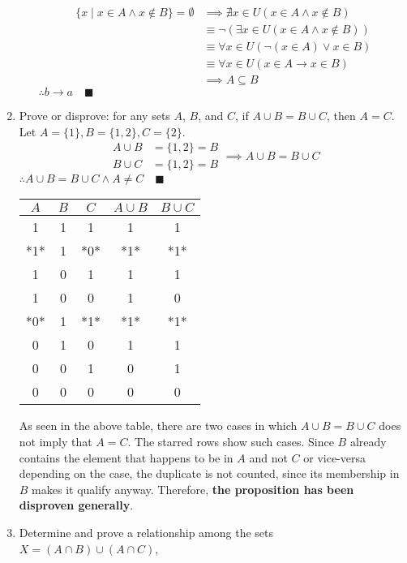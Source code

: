 \documentclass[letterpaper, 12pt]{article}
\newcommand{\qed}{\quad \blacksquare}
\newcommand{\then}{\rightarrow}
\newcommand{\0}{\emptyset}
\begin{document}
\begin{enumerate}
\begin{enumerate}[i.]
    \begin{align*}
        \{x \mid x \in A \wedge x \notin B\} = \0 
        &\implies \nexists x \in U(x \in A \wedge x \notin B) \\
        &\equiv \neg(\exists x \in U (x \in A \wedge x \notin B)) \\
        &\equiv \forall x \in U (\neg(x \in A) \vee x \in B) \\
        &\equiv \forall x \in U (x \in A \then x \in B) \\
        &\implies A \subseteq B
    \end{align*}
    $\therefore b \then a \qed$
\end{enumerate}
\item Prove or disprove: for any sets $A$, $B$, and $C$, if $A \cup B = B \cup C$, then $A = C$.
Let $A = \{1\}, B = \{1, 2\}, C = \{2\}$.
\[
\begin{aligned}
    A \cup B &= \{1, 2\} = B \\
    B \cup C &= \{1, 2\} = B
\end{aligned}
\implies A \cup B = B \cup C
\]
$\therefore A \cup B = B \cup C \wedge A \ne C \qed$
\begin{center}
\begin{tabular}{c | c | c | c | c}
    $A$ & $B$ & $C$ & $A \cup B$ & $B \cup C$ \\
    \hline
    1 & 1 & 1 & 1 & 1 \\
    *1* & 1 & *0* & *1* & *1* \\
    1 & 0 & 1 & 1 & 1 \\
    1 & 0 & 0 & 1 & 0 \\
    *0* & 1 & *1* & *1* & *1* \\
    0 & 1 & 0 & 1 & 1 \\
    0 & 0 & 1 & 0 & 1 \\
    0 & 0 & 0 & 0 & 0 \\
\end{tabular}
\end{center}
\begin{flushleft}
    As seen in the above table, there are two cases in which $A \cup B = B \cup C$ does not 
    imply that $A = C$. The starred rows show such cases. Since $B$ already contains the 
    element that happens to be in $A$ and not $C$ or vice-versa depending on the case, the 
    duplicate is not counted, since its membership in $B$ makes it qualify anyway. Therefore, 
    \textbf{the proposition has been disproven generally}.
\end{flushleft}
\item Determine and prove a relationship among the sets \\ $X = (A \cap B) \cup (A \cap C)$, 

\end{enumerate}
\end{document}

